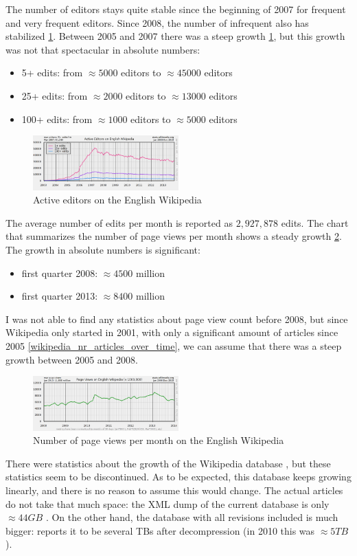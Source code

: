 \documentclass[12pt]{report}
\begin{document}
The number of editors stays quite stable since the beginning of 2007
for frequent and very frequent editors. Since 2008, the number of
infrequent also has stabilized \ref{wikipedia_active_editors}. Between 2005 and 2007 there was a
steep growth \ref{wikipedia_active_editors}, but this growth was not
that spectacular in absolute numbers:
\begin{itemize}
\item 5+ edits: from $\approx 5000$ editors to $\approx 45000$ editors
\item 25+ edits: from $\approx 2000$ editors to $\approx 13000$ editors
\item 100+ edits: from $\approx 1000$ editors to $\approx 5000$ editors
\end{itemize}
\begin{figure}[h!]
  \caption{Active editors on the English Wikipedia}
  \label{wikipedia_active_editors}
  \centering
    \includegraphics[width=0.5\textwidth]{pics/wikipedia_active_editors.png}
\end{figure}
The average number of edits per month is reported as $2,927,878$
edits.
The chart that summarizes the number of page views per month shows 
a steady growth \ref{wikipedia_page_views}. The growth in absolute
numbers is significant:
\begin{itemize}
\item first quarter 2008: $\approx 4500$ million
\item first quarter 2013: $\approx 8400$ million
\end{itemize}
I was not able to find any statistics about page view count before
2008, but since Wikipedia only started in 2001, with only a
significant amount of articles since 2005 \ref{wikipedia_nr_articles_over_time}, we can assume that there
was a steep growth between 2005 and 2008.
\begin{figure}[h!]
  \caption{Number of page views per month on the English Wikipedia}
  \label{wikipedia_page_views}
  \centering
    \includegraphics[width=0.5\textwidth]{pics/wikipedia_page_views.png}
\end{figure}
There were statistics about the growth of the Wikipedia database
\cite{wikipedia_database_growth}, but these statistics seem to be
discontinued. As to be expected, this database keeps growing linearly,
and there is no reason to assume this would change.
The actual articles do not take that much space: the XML dump of the
current database is only $\approx 44 GB$ \cite{wikipedia_size}. 
On the other hand, the database with all
revisions included is much bigger: \cite{wikipedia_size} reports it to be several
TBs after decompression (in 2010 this was $\approx 5TB$ \cite{wikipedia_full_size}).
\end{document}
